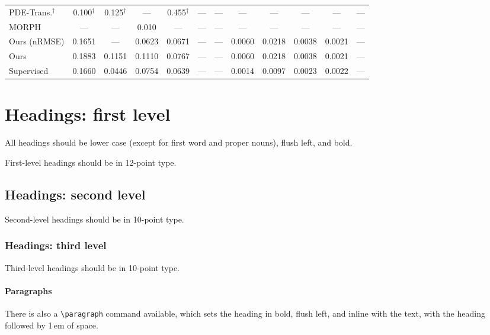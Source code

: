 \documentclass{article}
\begin{document}
\begin{table}[t]
{\begin{tabular}{l cccc ccccccc}
PDE-Trans.$^\dagger$ & 0.100$^\dagger$ & 0.125$^\dagger$ & ---          & 0.455$^\dagger$ & --- & --- & --- & ---             & ---             & ---    & --- \\
MORPH            & ---             & ---             & 0.010           & ---             & --- & --- & --- & ---             & ---             & ---    & --- \\
\midrule
Ours (nRMSE)     & 0.1651          & ---             & 0.0623          & 0.0671          & --- & --- & 0.0060 & 0.0218 & 0.0038 & 0.0021 & --- \\
Ours             & 0.1883          & 0.1151          & 0.1110          & 0.0767          & --- & --- & 0.0060 & 0.0218 & 0.0038 & 0.0021 & --- \\
Supervised       & 0.1660          & 0.0446          & 0.0754          & 0.0639          & --- & --- & 0.0014 & 0.0097 & 0.0023 & 0.0022 & --- \\
\bottomrule
\end{tabular}%
}
\end{table}

\section{Headings: first level}
\label{headings}


All headings should be lower case (except for first word and proper nouns),
flush left, and bold.


First-level headings should be in 12-point type.


\subsection{Headings: second level}


Second-level headings should be in 10-point type.


\subsubsection{Headings: third level}


Third-level headings should be in 10-point type.


\paragraph{Paragraphs}


There is also a \verb+\paragraph+ command available, which sets the heading in
bold, flush left, and inline with the text, with the heading followed by 1\,em
of space.
\end{document}
